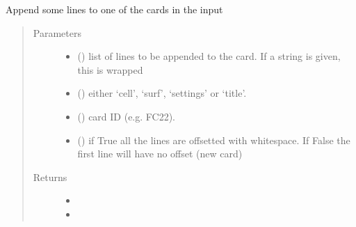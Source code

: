 \documentclass[letterpaper,10pt,english]{sphinxmanual}
\begin{document}
\begin{fulllineitems}
\begin{fulllineitems}
\label{\detokenize{api/inputgeneration:inputfile.InputFile.addlines2card}}
\sphinxAtStartPar
Append some lines to one of the cards in the input
\begin{quote}\begin{description}
\item[{Parameters}] \leavevmode\begin{itemize}
\item {} 
\sphinxAtStartPar
{} () \textendash{} list of lines to be appended to the card. If a string is given,
this is wrapped

\item {} 
\sphinxAtStartPar
{} () \textendash{} either ‘cell’, ‘surf’, ‘settings’ or ‘title’.

\item {} 
\sphinxAtStartPar
{} () \textendash{} card ID (e.g. FC22).

\item {} 
\sphinxAtStartPar
{} (\sphinxstyleliteralemphasis{\sphinxupquote{, }}) \textendash{} if True all the lines are off\sphinxhyphen{}setted with whitespace. If False
the first line will have no offset (new card)

\end{itemize}

\item[{Returns}] \leavevmode
\sphinxAtStartPar
\begin{itemize}
\item {} 
\sphinxAtStartPar
{}

\item {} 
\sphinxAtStartPar
{}


\end{itemize}
\end{description}
\end{quote}
\end{fulllineitems}
\end{fulllineitems}
\end{document}
